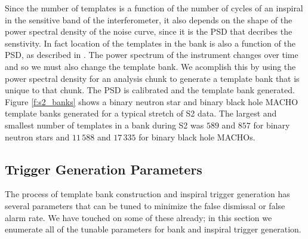 Since the number of templates is a function of the number of cycles of an
inspiral in the sensitive band of the interferometer, it also depends on the
shape of the power spectral density of the noise curve, since it is the PSD
that decribes the senstivity. In fact location of the templates in the bank is
also a function of the PSD, as described in \cite{Owen:1998dk}. The power
spectrum of the instrument changes over time and so we must also change the
template bank. We acomplish this by using the power spectral density for an
analysis chunk to generate a template bank that is unique to that chunk. The
PSD is calibrated and the template bank generated. Figure \ref{f:s2_banks}
shows a binary neutron star and binary black hole MACHO template banks
generated for a typical stretch of S2 data.  The largest and smallest number
of templates in a bank during S2 was $589$ and $857$ for binary neutron stars
and $11\,588$ and $17\,335$ for binary black hole MACHOs.

\subsection{Trigger Generation Parameters}
\label{ss:triggerparameters}

The process of template bank construction and inspiral trigger generation has
several parameters that can be tuned to minimize the false dismissal or false
alarm rate. We have touched on some of these already; in this section we
enumerate all of the tunable parameters for bank and inspiral trigger
generation.

